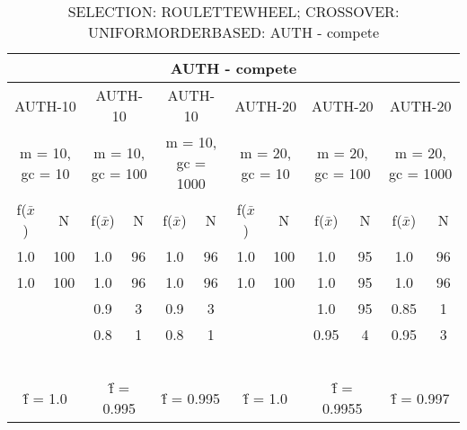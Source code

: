 \begin{table}[H]
	\centering
	\caption{SELECTION: ROULETTEWHEEL; CROSSOVER: UNIFORMORDERBASED: AUTH - compete}
	\begin{adjustbox}{width=1\textwidth}
		\begin{tabular}{ |c|c||c|c||c|c||c|c||c|c||c|c| }
			\hline
			\multicolumn{12}{|c|}{AUTH - compete} \\
			\hline
			\multicolumn{2}{|c||}{AUTH-10} & \multicolumn{2}{c||}{AUTH-10} & \multicolumn{2}{c||}{AUTH-10} & \multicolumn{2}{c||}{AUTH-20} & \multicolumn{2}{c||}{AUTH-20} & \multicolumn{2}{c|}{AUTH-20}\\
			\hline
			\multicolumn{2}{|c||}{m = 10, gc = 10} & \multicolumn{2}{c||}{m = 10, gc = 100} & \multicolumn{2}{c||}{m = 10, gc = 1000} & \multicolumn{2}{c||}{m = 20, gc = 10} & \multicolumn{2}{c||}{m = 20, gc = 100} & \multicolumn{2}{c|}{m = 20, gc = 1000}\\
			\hline
			f($\bar{x}$) & N & f($\bar{x}$) & N & f($\bar{x}$) & N & f($\bar{x}$) & N & f($\bar{x}$) & N & f($\bar{x}$) & N\\
			\hline
			\hline
			1.0 & 100 & 1.0 & 96 & 1.0 & 96 & 1.0 & 100 & 1.0 & 95 & 1.0 & 96\\
			\hline
			1.0 & 100 & 1.0 & 96 & 1.0 & 96 & 1.0 & 100 & 1.0 & 95 & 1.0 & 96\\
			&   & 0.9 & 3 & 0.9 & 3 &   &   & 1.0 & 95 & 0.85 & 1\\
			&   & 0.8 & 1 & 0.8 & 1 &   &   & 0.95 & 4 & 0.95 & 3\\
			&   &   &   &   &   &   &   &   &   &   &  \\
			&   &   &   &   &   &   &   &   &   &   &  \\
			&   &   &   &   &   &   &   &   &   &   &  \\
			&   &   &   &   &   &   &   &   &   &   &  \\
			&   &   &   &   &   &   &   &   &   &   &  \\
			\hline
			\multicolumn{2}{|c||}{\^{f} = 1.0} & \multicolumn{2}{c||}{\^{f} = 0.995} & \multicolumn{2}{c||}{\^{f} = 0.995} & \multicolumn{2}{c||}{\^{f} = 1.0} & \multicolumn{2}{c||}{\^{f} = 0.9955} & \multicolumn{2}{c|}{\^{f} = 0.997}\\
			\hline
		\end{tabular}
	\end{adjustbox}
\end{table}
